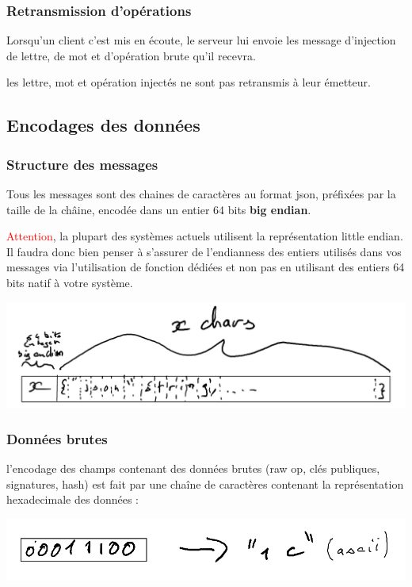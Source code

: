 \documentclass{article}
\begin{document}
 \subsubsection{Retransmission d'opérations}
 \label{sec:forward}
 Lorsqu'un client c'est mis en écoute, le serveur lui envoie les
 message d'injection de lettre, de mot et d'opération brute qu'il
 recevra.

 les lettre, mot et opération injectés ne sont pas retransmis à leur
 émetteur.

 \subsection{Encodages des données}
 \label{sec:encodages}

 \subsubsection{Structure des messages}
 \label{sec:struct-des-mess}

 Tous les messages sont des chaines de caractères au format json,
 préfixées par la taille de la châine, encodée dans un entier 64 bits
 \textbf{big endian}.

 \textcolor{red}{Attention}, la plupart des systèmes actuels
 utilisent la représentation little endian. Il faudra donc bien penser
 à s'assurer de l'endianness des entiers utilisés dans vos messages
 via l'utilisation de fonction dédiées et non pas en utilisant des
 entiers 64 bits natif à votre système.

 \includegraphics{images/encodage_message.png}

 \subsubsection{Données brutes}
 \label{sec:enc-donnees-brutes}

 l'encodage des champs contenant des données brutes (raw op, clés
 publiques, signatures, hash) est fait par une chaîne de caractères
 contenant la représentation hexadecimale des données :

 \includegraphics{images/encodage_octets.png}
\end{document}
